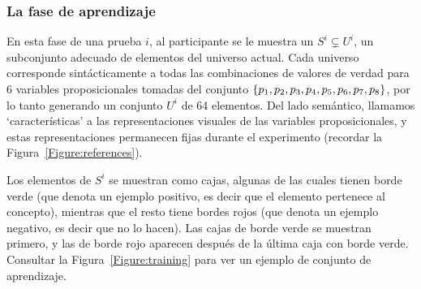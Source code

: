 \subsubsection{La fase de aprendizaje}\label{Subsection:learning}

En esta fase de una prueba $ i $, al participante se le muestra un $ S^i \subsetneq U^i $, un subconjunto adecuado de elementos del universo actual. Cada universo corresponde sintácticamente a todas las combinaciones de valores de verdad para 6 variables proposicionales tomadas del conjunto $\{p_1, p_2, p_3, p_4, p_5, p_6, p_7, p_8\}$, por lo tanto generando un conjunto $ U^i $ de 64 elementos. Del lado semántico, llamamos `características' a las representaciones visuales de las variables proposicionales, y estas representaciones permanecen fijas durante el experimento (recordar la Figura~\ref{Figure:references}).

Los elementos de $ S^i $ se muestran como cajas, algunas de las cuales tienen borde verde (que denota un ejemplo positivo, es decir que el elemento pertenece al concepto), mientras que el resto tiene bordes rojos (que denota un ejemplo negativo, es decir que no lo hacen). Las cajas de borde verde se muestran primero, y las de borde rojo aparecen después de la última caja con borde verde. Consultar la Figura~\ref{Figure:training} para ver un ejemplo de conjunto de aprendizaje.

